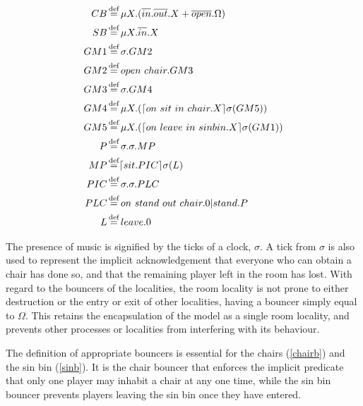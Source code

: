 \begin{table}[h]
  \caption{Summary of Processes and Derived Syntax for Musical Chairs}
  \label{tab:musicalchairs}
  \shrule
  \begin{align}
   CB &
    \operatorname{\stackrel{\textrm{def}}{=}} 
    \mu X.(\overline{in}.\overline{out}.X + \overline{open}.\Omega) \label{chairb} \\
   SB &
    \operatorname{\stackrel{\textrm{def}}{=}} 
    \mu X.\overline{in}.X \label{sinb} \\
   GM1 &
    \operatorname{\stackrel{\textrm{def}}{=}} 
    \sigma.GM2 \label{gmstage2} \\
    GM2 &
    \operatorname{\stackrel{\textrm{def}}{=}} 
    open\ chair.GM3 \label{gmstage3} \\
   GM3 &
   \operatorname{\stackrel{\textrm{def}}{=}}
   \sigma.GM4 \label{gmstage4} \\
   GM4 &
    \operatorname{\stackrel{\textrm{def}}{=}}  
    \mu X.(\lceil{on\ sit\ in\ chair.X}\rceil {\sigma} ({GM5})) \label{gmstage5} \\
   GM5 &
    \operatorname{\stackrel{\textrm{def}}{=}} 
    \mu X.(\lceil{on\ leave\ in\ sinbin.X}\rceil {\sigma} ({GM1})) \label{gmstage6}\\
    P &
    \operatorname{\stackrel{\textrm{def}}{=}} 
    \sigma.\sigma.MP \label{player} \\
    MP &
    \operatorname{\stackrel{\textrm{def}}{=}}
    \lceil{sit.PIC}\rceil {\sigma} ({L}) \label{mplayer}\\
   PIC &
    \operatorname{\stackrel{\textrm{def}}{=}} 
    \sigma.\sigma.PLC \label{pinchair} \\
   PLC &
   \operatorname{\stackrel{\textrm{def}}{=}}
   on\ stand\ out\ chair.0|stand.P \label{pleavechair} \\
   L &
    \operatorname{\stackrel{\textrm{def}}{=}} 
    leave.0 \label{loser} 
  \end{align}
  \shrule
\end{table}

The presence of music is signified by the ticks of a clock, $\sigma$.  A
tick from $\sigma$ is also used to represent the implicit
acknowledgement that everyone who can obtain a chair has done so, and
that the remaining player left in the room has lost.  With regard to the
bouncers of the localities, the room locality is not prone to either
destruction or the entry or exit of other localities, having a bouncer
simply equal to $\Omega$.  This retains the encapsulation of the model
as a single room locality, and prevents other processes or localities
from interfering with its behaviour.

The definition of appropriate bouncers is essential for the chairs
(\ref{chairb}) and the sin bin (\ref{sinb}).  It is the chair bouncer
that enforces the implicit predicate that only one player may inhabit a
chair at any one time, while the sin bin bouncer prevents players
leaving the sin bin once they have entered.


